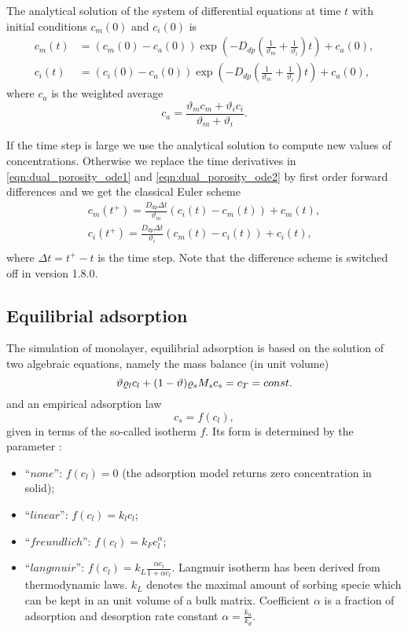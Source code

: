 The analytical solution of the system of differential equations at time $t$ with initial conditions $c_m(0)$ and $c_i(0)$ is
\begin{align}
     c_m(t) &= (c_m(0) - c_a(0)) \exp\left(- D_{dp}\left(\frac{1}{\vartheta_m} + \frac{1}{\vartheta_i}\right) t \right) + c_a(0), \\
     c_i(t) &= (c_i(0) - c_a(0)) \exp\left(- D_{dp}\left(\frac{1}{\vartheta_m} + \frac{1}{\vartheta_i}\right) t \right) + c_a(0),
\end{align}
where $c_a$ is the weighted average
\[
  c_a = \frac{\vartheta_m c_m + \vartheta_i c_i}{\vartheta_m + \vartheta_i}.
\]

If the time step is large we use the analytical solution to compute new values of concentrations. 
Otherwise we replace the time derivatives in \eqref{eqn:dual_porosity_ode1} and \eqref{eqn:dual_porosity_ode2} 
by first order forward differences and we get the classical Euler scheme
\begin{align}
  c_m(t^+) = \frac{D_{dp} \Delta t}{\vartheta_m}(c_i(t) - c_m(t)) + c_m(t), \\
  c_i(t^+) = \frac{D_{dp} \Delta t}{\vartheta_i}(c_m(t) - c_i(t)) + c_i(t), \\
\end{align}
where $\Delta t = t^+ - t$ is the time step. Note that the difference scheme is switched off in version 1.8.0.

\subsection{Equilibrial adsorption}
\label{sec:sorp_math}

The simulation of monolayer, equilibrial adsorption is based on the solution of two algebraic equations, namely the mass balance (in unit volume)
\begin{equation}
\label{eq:mass_balance_sorption}
\th \varrho_l c_l + (1-\th) \varrho_s M_s c_s = c_T = const.
\end{equation}
and an empirical adsorption law
\begin{equation}
\label{eq:relation_cs_cl}
c_s = f(c_l),
\end{equation}
given in terms of the so-called isotherm $f$.
Its form is determined by the parameter :
\begin{itemize}
 \item ``$none$'': $f(c_l)=0$ (the adsorption model returns zero concentration in solid);
 \item ``$linear$'': $f(c_l) = k_l c_l$;
 \item ``$freundlich$'': $f(c_l) = k_F c_l^{\alpha}$;
 \item ``$langmuir$'': $f(c_l) = k_L \frac{\alpha c_l}{1 + \alpha c_l}$.
       Langmuir isotherm has been derived from thermodynamic laws. $k_L$ denotes the maximal amount 
       of sorbing specie which can be kept in an unit volume of a bulk matrix. Coefficient $\alpha$ is 
       a fraction of adsorption and desorption rate constant $\alpha = \frac{k_a}{k_d}$.
\end{itemize}

